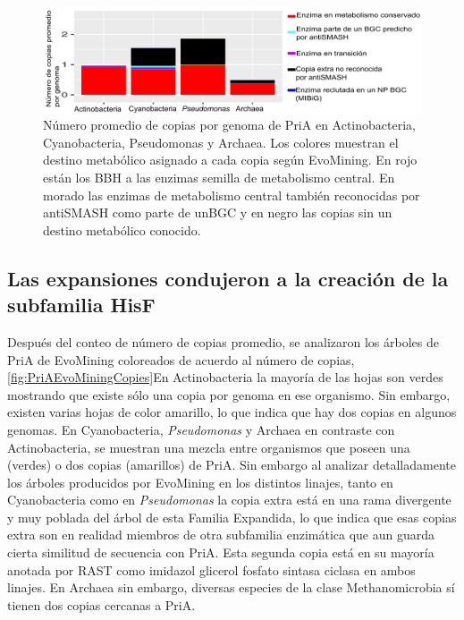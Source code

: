 \documentclass[12pt,twoside]{reedthesis}
\begin{document}
  \begin{figure}[h!tbp]
  \centering
  \includegraphics[angle = 0,scale = 0.8]{chapter4/PriAExpansiones.png}
  \caption[Expansiones de PriA en Actinobacteria, Cyanobacteria, Pseudomonas y Archaea]{\footnotesize{Número promedio de copias por genoma de PriA en Actinobacteria, Cyanobacteria, Pseudomonas y Archaea. Los colores muestran el destino metabólico asignado a cada copia según EvoMining. En rojo están los BBH a las enzimas semilla de metabolismo central. En morado las enzimas de metabolismo central también reconocidas por antiSMASH como parte de unBGC y en negro las copias sin un destino metabólico conocido.}}
  \label{fig:PriA_Expansiones}
  \end{figure}
  
  \subsection{Las expansiones condujeron a la creación de la subfamilia
  HisF}\label{las-expansiones-condujeron-a-la-creacion-de-la-subfamilia-hisf}
  
  Después del conteo de número de copias promedio, se analizaron los
  árboles de PriA de EvoMining coloreados de acuerdo al número de copias,
  \autoref{fig:PriAEvoMiningCopies}En Actinobacteria la mayoría de las
  hojas son verdes mostrando que existe sólo una copia por genoma en ese
  organismo. Sin embargo, existen varias hojas de color amarillo, lo que
  indica que hay dos copias en algunos genomas. En Cyanobacteria,
  \emph{Pseudomonas} y Archaea en contraste con Actinobacteria, se
  muestran una mezcla entre organismos que poseen una (verdes) o dos
  copias (amarillos) de PriA. Sin embargo al analizar detalladamente los
  árboles producidos por EvoMining en los distintos linajes, tanto en
  Cyanobacteria como en \emph{Pseudomonas} la copia extra está en una rama
  divergente y muy poblada del árbol de esta Familia Expandida, lo que
  indica que esas copias extra son en realidad miembros de otra subfamilia
  enzimática que aun guarda cierta similitud de secuencia con PriA. Esta
  segunda copia está en su mayoría anotada por RAST como imidazol glicerol
  fosfato sintasa ciclasa en ambos linajes. En Archaea sin embargo,
  diversas especies de la clase Methanomicrobia sí tienen dos copias
  cercanas a PriA.
  
\end{document}

